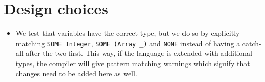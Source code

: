 \section{Design choices}

\begin{itemize}
  \item We test that variables have the correct type, but we do so by
  explicitly matching \verb+SOME Integer+, \verb+SOME (Array _)+ and
  \verb+NONE+ instead of having a catch-all after the two first. This way, if
  the language is extended with additional types, the compiler will give
  pattern matching warnings which signify that changes need to be added here as
  well.
\end{itemize}
